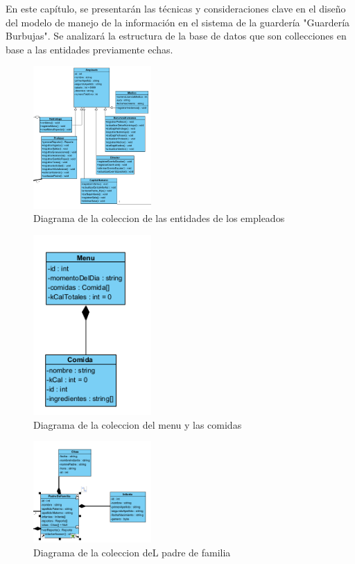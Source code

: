 En este capítulo, se presentarán las técnicas y consideraciones clave en el diseño del modelo de manejo de la información en el sistema de la guardería "Guardería Burbujas". Se analizará la estructura de la base de datos que son collecciones en base a las entidades previamente echas.


\begin{figure}[htbp]
\centering
\includegraphics[width=0.4\textwidth]{images/arqui/comEmpleados.png}
\caption{Diagrama de la coleccion de las entidades de los empleados}
\label{fig:colecEmp}
\end{figure}

\begin{figure}[htbp]
\centering
\includegraphics[width=0.4\textwidth]{images/arqui/colmenuComida.png}
\caption{Diagrama de la coleccion del menu y las comidas}
\label{fig:colecMenucCOM}
\end{figure}

\begin{figure}[htbp]
\centering
\includegraphics[width=0.4\textwidth]{images/arqui/colPadreFamilia.png}
\caption{Diagrama de la coleccion deL padre de familia}
\label{fig:colecPadre}
\end{figure}

